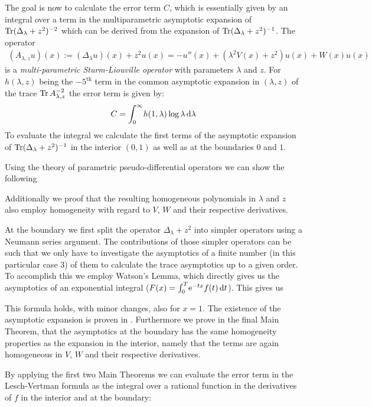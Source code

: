 The goal is now to calculate the error term $C$, which is essentially given by
an integral over a term in the multiparametric asymptotic expansion of
$\Tr(\Delta_\lambda + z^2)^{-2}$ which can be derived from the expansion of
$\Tr(\Delta_\lambda + z^2)^{-1}$. The operator
\begin{align*}
  (A_{\lambda,z}u)(x) := (\Delta_\lambda u)(x) + z^2 u(x)
           = -u''(x) + (\lambda^2 V(x) + z^2) u(x) + W(x) u(x)
\end{align*}
is a \emph{multi-parametric Sturm-Liouville operator} with parameters $\lambda$
and $z$. For $h(\lambda,z)$ being the $-5^{\text{th}}$ term in the common
asymptotic expansion in $(\lambda,z)$ of the trace $\Tr A_{\lambda,z}^{-2}$ the
error term is given by:
\begin{align*}
  C = \Integ[\infty]{0}{\lambda}{h(1,\lambda)\log\lambda}
\end{align*}
To evaluate the integral we calculate the first terms of the asymptotic
expansion of $\Tr(\Delta_\lambda + z^2)^{-1}$ in the interior $(0,1)$ as well as
at the boundaries $0$ and $1$.

Using the theory of parametric pseudo-differential operators we can show the
following
\begin{MainTheorem}
  
\end{MainTheorem}
Additionally we proof that the resulting homogeneous polynomials in $\lambda$
and $z$ also employ homogeneity with regard to $V$, $W$ and their respective
derivatives.

At the boundary we first split the operator $\Delta_\lambda + z^2$ into simpler
operators using a Neumann series argument. The contributions of those simpler
operators can be %
such that we only have to investigate the asymptotics of a finite number (in
this particular case 3) of them to calculate the trace asymptotics up to a given
order.
%
To accomplish this we employ Watson's Lemma, which directly gives us the
asymptotics of an exponential integral ($F(x) =
\Integ[T]{0}{t}{\Eto{-tx}f(t)}$). This gives us
\begin{MainTheorem}
  
\end{MainTheorem}
This formula holds, with minor changes, also for $x=1$. The existence of the
asymptotic expansion is proven in \cite{LV13}.
%
Furthermore we prove in the final Main Theorem, that the asymptotics at the
boundary has the same homogeneity properties as the expansion in the interior,
namely that the terms are again homogeneous in $V$, $W$ and their respective
derivatives.

By applying the first two Main Theorems we can evaluate the error term in the
Lesch-Vertman formula as the integral over a rational function in the
derivatives of $f$ in the interior and at the boundary:
